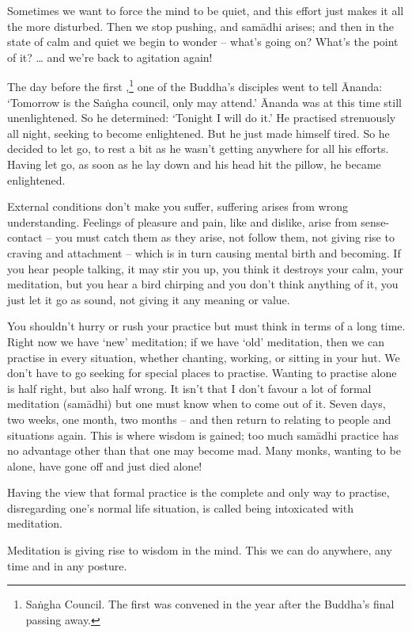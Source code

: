 Sometimes we want to force the mind to be quiet, and this effort just makes it all the more disturbed. Then we stop pushing, and sam\=adhi arises; and then in the state of calm and quiet we begin to wonder -- what's going on? What's the point of it? \ldots{} and we're back to agitation again!

The day before the first ,\footnote{Sa\.ngha Council. The first was convened in the year after the Buddha's final passing away.} one of the Buddha's disciples went to tell \=Ananda: `Tomorrow is the Sa\.ngha council, only  may attend.' \=Ananda was at this time still unenlightened. So he determined: `Tonight I will do it.' He practised strenuously all night, seeking to become enlightened. But he just made himself tired. So he decided to let go, to rest a bit as he wasn't getting anywhere for all his efforts. Having let go, as soon as he lay down and his head hit the pillow, he became enlightened.

External conditions don't make you suffer, suffering arises from wrong understanding. Feelings of pleasure and pain, like and dislike, arise from sense-contact -- you must catch them as they arise, not follow them, not giving rise to craving and attachment -- which is in turn causing mental birth and becoming. If you hear people talking, it may stir you up, you think it destroys your calm, your meditation, but you hear a bird chirping and you don't think anything of it, you just let it go as sound, not giving it any meaning or value.

You shouldn't hurry or rush your practice but must think in terms of a long time. Right now we have `new' meditation; if we have `old' meditation, then we can practise in every situation, whether chanting, working, or sitting in your hut. We don't have to go seeking for special places to practise. Wanting to practise alone is half right, but also half wrong. It isn't that I don't favour a lot of formal meditation (sam\=adhi) but one must know when to come out of it. Seven days, two weeks, one month, two months -- and then return to relating to people and situations again. This is where wisdom is gained; too much sam\=adhi practice has no advantage other than that one may become mad. Many monks, wanting to be alone, have gone off and just died alone!

Having the view that formal practice is the complete and only way to practise, disregarding one's normal life situation, is called being intoxicated with meditation.

Meditation is giving rise to wisdom in the mind. This we can do anywhere, any time and in any posture. 
